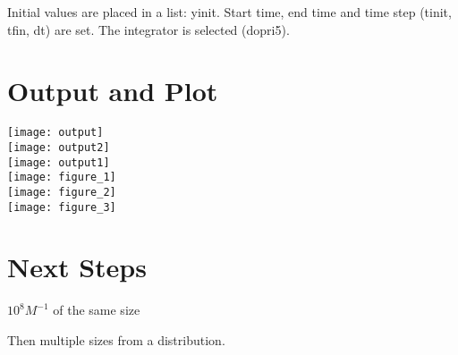 \documentclass[11pt]{article} %
\begin{document}
Initial values are placed in a list: yinit.  Start time, end time and time step (tinit, tfin, dt) are set.  The integrator is selected (dopri5).

\section{Output and Plot}

\texttt{[image: output]}\\

\texttt{[image: output2]}\\

\texttt{[image: output1]}\\

\texttt{[image: figure\_1]}\\

\texttt{[image: figure\_2]}\\

\texttt{[image: figure\_3]}\\

\section{Next Steps}

$10^{8}M^{-1}$ of the same size

Then multiple sizes from a distribution.
\end{document}
